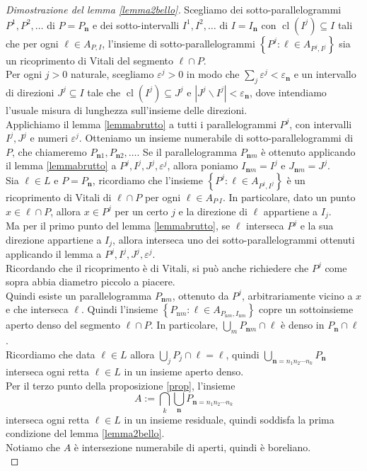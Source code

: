 \documentclass[a4paper, twoside,openright]{article}
\newcommand{\e}{\varepsilon}
\newcommand{\<}{\langle}
\renewcommand{\>}{\rangle}
\begin{document}
\begin{proof}[Dimostrazione del lemma \ref{lemma2bello}]
Scegliamo dei sotto-parallelogrammi $P^{1}, P^{2}, \ldots$ di $P=P_{\mathbf{n}}$ e dei sotto-intervalli $I^{1}, I^{2}, \ldots$ di $I=I_{\mathbf{n}}$ con $\operatorname{cl}(I^j) \subseteq I$ tali che per ogni $\ell \in A_{P, I}$, l'insieme di sotto-parallelogrammi $\left\{P^{j}: \ell \in A_{P^{j}, I^{j}}\right\}$
sia un ricoprimento di Vitali del segmento $\ell \cap P$. \\
Per ogni $j>0$ naturale, scegliamo  $\varepsilon^{j} >0$ in modo che $\sum_j \e^j < \e_{\mathbf{n}}$ e un intervallo di direzioni $J^{j} \subseteq I$ tale che $\operatorname{cl}\left(I^{j}\right) \subseteq J^{j}$ e $\left|J^{j} \backslash I^{j}\right|<\varepsilon_\mathbf{n}$, dove intendiamo l'usuale misura di lunghezza sull'insieme delle direzioni.\\ 
Applichiamo il lemma \ref{lemmabrutto} a tutti i parallelogrammi $P^{j}$, con intervalli $I^{j}, J^{j}$ e numeri $\varepsilon^{j}$. Otteniamo un insieme numerabile di sotto-parallelogrammi di $P$, che chiameremo $P_{\mathbf{n} 1}, P_{\mathbf{n} 2}, \ldots$. Se il parallelogramma $P_{\mathbf{n} m}$ è ottenuto applicando il lemma \ref{lemmabrutto} a $P^{j}, I^{j}, J^{j}, \varepsilon^{j}$, allora poniamo $I_{\mathbf{n} m}=I^{j}$ e $J_{\mathbf{n} m}=J^{j}$.\\

Sia $\ell \in L$ e $P=P_{\mathbf{n}}$, ricordiamo che l'insieme $\left\{P^{j}: \ell \in A_{P^{j}, I^{j}}\right\}$ è un ricoprimento di Vitali di $\ell \cap P$ per ogni $\ell \in A_{P^, I}$. In particolare, dato un punto $x \in \ell \cap P$, allora $x \in P^j$ per un certo $j$ e la direzione di $\ell$ appartiene a $I_j$.\\
Ma per il primo punto del lemma \ref{lemmabrutto}, se $\ell$ interseca $P^j$ e la sua direzione appartiene a $I_j$, allora interseca uno dei sotto-parallelogrammi ottenuti applicando il lemma a $P^{j}, I^{j}, J^{j}, \varepsilon^{j}$.\\
Ricordando che il ricoprimento è di Vitali, si può anche richiedere che $P^j$ come sopra abbia diametro piccolo a piacere.\\
Quindi esiste un parallelogramma $P_{\mathbf{n}m}$, ottenuto da $P^j$, arbitrariamente vicino a $x$ e che interseca $\ell$. Quindi l'insieme $\left\{P_{\mathrm{n} m}: \ell \in A_{P_{\mathrm{n}m}, I_{\mathrm{n} m}}\right\}$
copre un sottoinsieme aperto denso del segmento $\ell \cap P$. In particolare, $\bigcup_m P_{\mathbf{n}m} \cap \ell$ è denso in $P_\mathbf{n} \cap \ell$.\\
Ricordiamo che data $\ell \in L$ allora $ \bigcup_j P_j \cap \ell = \ell $, quindi $\bigcup_{\mathbf{n}=n_{1} n_{2} \cdots n_{k}} P_{\mathbf{n}}$ interseca ogni retta $\ell \in L$ in un insieme aperto denso.\\
Per il terzo punto della proposizione \ref{prop}, l'insieme 
$$
A:= \bigcap_{k} \bigcup_{\mathbf{n}} P_{\mathbf{n}=n_{1} n_{2} \cdots n_{k}}
$$
interseca ogni retta $\ell \in L$ in un insieme residuale, quindi soddisfa la prima condizione del lemma \ref{lemma2bello}.\\
Notiamo che $A$ è intersezione numerabile di aperti, quindi è boreliano.\\


\end{proof}
\end{document}
